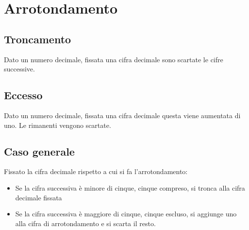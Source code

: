 \chapter{Arrotondamento}
\section{Troncamento}
\begin{defn}
Dato un numero decimale, fissata una cifra decimale sono scartate le cifre successive.
\end{defn}
\section{Eccesso}
\begin{defn}
	Dato un numero decimale, fissata una cifra decimale questa viene aumentata di uno. Le rimanenti vengono scartate.
\end{defn}
\section{Caso generale}
\begin{defn}
	Fissato la cifra decimale rispetto a cui si fa l'arrotondamento:
	\begin{itemize}
		\item Se la cifra successiva è minore di cinque, cinque compreso, si tronca alla cifra decimale fissata
		\item Se la cifra successiva è maggiore di cinque, cinque escluso, si aggiunge uno alla cifra di arrotondamento e si scarta il resto.
	\end{itemize}
\end{defn}